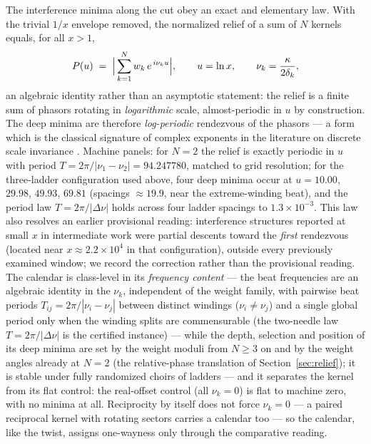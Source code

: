 \documentclass[11pt,a4paper]{article}
\begin{document}
The interference minima along the cut obey an exact and elementary law.
With the trivial $1/x$ envelope removed, the normalized relief of a sum
of $N$ kernels equals, for all $x > 1$,
\begin{equation}
P(u) \;=\; \Bigl|\,\sum_{k=1}^{N} w_k\, e^{\,i\nu_k u}\Bigr|,
\qquad u = \ln x,\qquad \nu_k = \frac{\kappa}{2\delta_k},
\label{eq:phasors}
\end{equation}
an algebraic identity rather than an asymptotic statement: the relief is
a finite sum of phasors rotating in \emph{logarithmic} scale,
almost-periodic in $u$ by construction. The deep minima are therefore
\emph{log-periodic} rendezvous of the phasors --- a form which is the
classical signature of complex exponents in the literature on discrete
scale invariance \cite{Derrida1984,Sornette1998}. Machine panels: for
$N = 2$ the relief is exactly periodic in $u$ with period
$T = 2\pi/|\nu_1 - \nu_2| = 94.247780$, matched to grid resolution; for
the three-ladder configuration used above, four deep minima occur at
$u = 10.00$, $29.98$, $49.93$, $69.81$ (spacings $\approx 19.9$, near
the extreme-winding beat), and the period law $T = 2\pi/|\Delta\nu|$
holds across four ladder spacings to $1.3\times10^{-3}$. This law also
resolves an earlier provisional reading: interference structures
reported at small $x$ in intermediate work were partial descents toward
the \emph{first} rendezvous (located near $x \approx 2.2\times10^{4}$ in
that configuration), outside every previously examined window; we record
the correction rather than the provisional reading. The calendar is
class-level in its \emph{frequency content} --- the beat frequencies are
an algebraic identity in the $\nu_k$, independent of the weight family,
with pairwise beat periods $T_{ij} = 2\pi/|\nu_i - \nu_j|$ between
distinct windings ($\nu_i \neq \nu_j$) and a single
global period only when the winding splits are commensurable (the
two-needle law $T = 2\pi/|\Delta\nu|$ is the certified instance) ---
while the depth, selection and position of its deep minima are set by the
weight moduli from $N \geq 3$ on and by the weight angles already at
$N = 2$ (the relative-phase translation of Section~\ref{sec:relief}); it
is stable under fully randomized choirs of ladders ---
and it separates the kernel from its flat control: the real-offset control
(all $\nu_k = 0$) is flat to machine zero, with no minima at all.
Reciprocity by itself does not force $\nu_k = 0$ --- a paired reciprocal
kernel with rotating sectors carries a calendar too --- so the calendar,
like the twist, assigns one-wayness only through the comparative reading.
\end{document}
